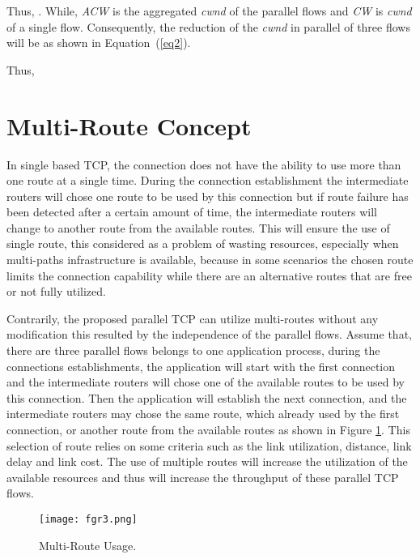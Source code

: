 \documentclass[a4paper, conference]{IEEEtran}
\begin{document}
Thus, .
\newline\newline
While, \emph{ACW} is the aggregated \textit{cwnd} of the parallel flows and \emph{CW} is \textit{cwnd} of a single flow. Consequently, the reduction of the \textit{cwnd} in parallel of three flows will be as shown in Equation~(\ref{eq2}).



Thus, 
\vspace{0.5cm}

\section{Multi-Route Concept}

In single based TCP, the connection does not have the ability to use more than one route at a single time. During the connection establishment the intermediate routers will chose one route to be used by this connection but if route failure has been detected after a certain amount of time, the intermediate routers will change to another route from the available routes. This will ensure the use of single route, this considered as a problem of wasting resources, especially when multi-paths infrastructure is available, because in some scenarios the chosen route limits the connection capability while there are an alternative routes that are free or not fully utilized.

Contrarily, the proposed parallel TCP can utilize multi-routes without any modification this resulted by the independence of the parallel flows. Assume that, there are three parallel flows belongs to one application process, during the connections establishments, the application will start with the first connection and the intermediate routers will chose one of the available routes to be used by this connection. Then the application will establish the next connection, and the intermediate routers may chose the same route, which already used by the first connection, or another route from the available routes as shown in Figure \ref{multi-route}. This selection of route relies on some criteria such as the link utilization, distance, link delay and link cost. The use of multiple routes will increase the utilization of the available resources and thus will increase the throughput of these parallel TCP flows.

\begin{figure}[h]
\centerline{\texttt{[image: fgr3.png]}}
\caption{Multi-Route Usage.}
\label{multi-route}
\end{figure}
\end{document}
